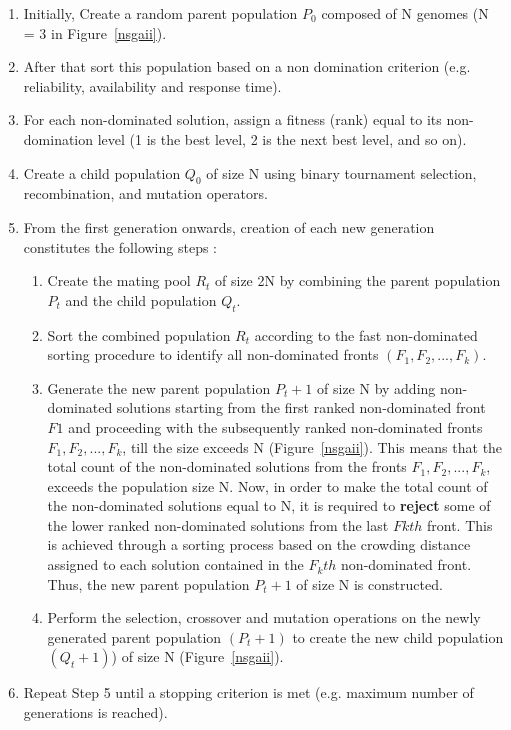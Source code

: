 \documentclass[conference]{IEEEtran}
\begin{document}
\begin{enumerate}
\item Initially, Create a random parent population $P_{0}$ composed of N genomes (N = 3 in Figure~\ref{nsgaii}).
\item After that sort this population based on a non domination criterion (e.g. reliability, availability and response time).
\item For each non-dominated solution, assign a fitness (rank) equal to its non-domination level (1 is the best level, 2 is the next best level, and so on).
\item Create a child population $Q_{0}$ of size N using binary tournament selection, recombination, and mutation operators.
\item From the first generation onwards, creation of each new generation constitutes the following steps :
	\begin{enumerate}	
	\item Create the mating pool $R_{t}$ of size 2N by combining the parent population $P_{t}$ and the child population $Q_{t}$.
	\item Sort the combined population $R_{t}$ according to the fast non-dominated sorting procedure to identify all non-dominated fronts $(F_{1} ,F_{2},...,F_{k})$.
	\item Generate the new parent population $P_{t}+1$ of size N by adding non-dominated solutions starting from the first ranked non-dominated front $F1$ and proceeding with the subsequently ranked non-dominated fronts $F_{1} ,F_{2}, . . . ,F_{k}$, till the size exceeds N (Figure~\ref{nsgaii}). This means that the total count of the non-dominated solutions from the fronts $F_{1} ,F_{2}, . . . ,F_{k}$, exceeds the population size N. Now, in order to make the total count of the non-dominated solutions equal to N, it is required to \textbf{reject} some of the lower ranked non-dominated solutions from the last $Fkth$ front. This is achieved through a sorting process based on the crowding distance assigned to each solution contained in the $F_{k}th$ non-dominated front. Thus, the new parent population $P_{t}+1$ of size N is constructed.
	\item Perform the selection, crossover and mutation operations on the newly generated parent population $(P_{t}+1)$ to create the new child population $(Q_{t}+1)$) of size N (Figure~\ref{nsgaii}).
	\end{enumerate}
\item Repeat Step 5 until a stopping criterion is met (e.g. maximum number of generations is reached).

\end{enumerate}
\end{document}
